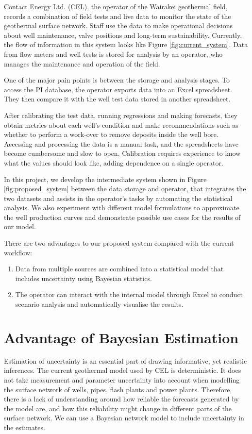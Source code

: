 \documentclass[a4paper, 12pt]{article}
\begin{document}
Contact Energy Ltd. (CEL), the operator of the Wairakei geothermal field, records a combination of field tests and live data to monitor the state of the geothermal surface network. Staff use the data to make operational decisions about well maintenance, valve positions and long-term sustainability. Currently, the flow of information in this system looks like Figure \ref{fig:current_system}. Data from flow meters and well tests is stored for analysis by an operator, who manages the maintenance and operation of the field. 

One of the major pain points is between the storage and analysis stages. To access the PI database, the operator exports data into an Excel spreadsheet. They then compare it with the well test data stored in another spreadsheet.

After calibrating the test data, running regressions and making forecasts, they obtain metrics about each well's condition and make recommendations such as whether to perform a work-over to remove deposits inside the well bore. Accessing and processing the data is a manual task, and the spreadsheets have become cumbersome and slow to open. Calibration requires experience to know what the values should look like, adding dependence on a single operator.

In this project, we develop the intermediate system shown in Figure \ref{fig:proposed_system} between the data storage and operator, that integrates the two datasets and assists in the operator's tasks by automating the statistical analysis. We also experiment with different model formulations to approximate the well production curves and demonstrate possible use cases for the results of our model.

There are two advantages to our proposed system compared with the current workflow:
\begin{enumerate}
\item Data from multiple sources are combined into a statistical model that includes uncertainty using Bayesian statistics.
\item The operator can interact with the internal model through Excel to conduct scenario analysis and automatically visualise the results.
\end{enumerate}

\section{Advantage of Bayesian Estimation}
Estimation of uncertainty is an essential part of drawing informative, yet realistic inferences. The current geothermal model used by CEL is deterministic. It does not take  measurement and parameter uncertainty into account when modelling the surface network of wells, pipes, flash plants and power plants. Therefore, there is a lack of understanding around how reliable the forecasts generated by the model are, and how this reliability might change in different parts of the surface network. We can use a Bayesian network model to include uncertainty in the estimates.
\end{document}
